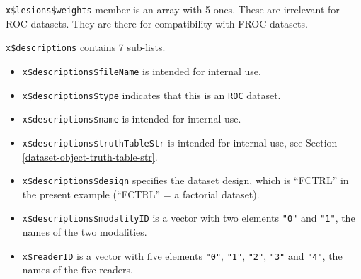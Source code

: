 \documentclass[
]{book}
\newenvironment{Shaded}{\begin{snugshade}}{\end{snugshade}}
\newcommand{\CommentTok}[1]{\textcolor[rgb]{0.56,0.35,0.01}{\textit{#1}}}
\newcommand{\FunctionTok}[1]{\textcolor[rgb]{0.00,0.00,0.00}{#1}}
\newcommand{\NormalTok}[1]{#1}
\newcommand{\SpecialCharTok}[1]{\textcolor[rgb]{0.00,0.00,0.00}{#1}}
\providecommand{\tightlist}{%
  \setlength{\itemsep}{0pt}\setlength{\parskip}{0pt}}
\begin{document}
\begin{Shaded}
\end{Shaded}

\texttt{x\$lesions\$weights} member is an array with 5 ones. These are irrelevant for ROC datasets. They are there for compatibility with FROC datasets.

\texttt{x\$descriptions} contains 7 sub-lists.

\begin{Shaded}
\end{Shaded}

\begin{itemize}
\tightlist
\item
  \texttt{x\$descriptions\$fileName} is intended for internal use.
\item
  \texttt{x\$descriptions\$type} indicates that this is an \texttt{ROC} dataset.
\item
  \texttt{x\$descriptions\$name} is intended for internal use.
\item
  \texttt{x\$descriptions\$truthTableStr} is intended for internal use, see Section \ref{dataset-object-truth-table-str}.
\item
  \texttt{x\$descriptions\$design} specifies the dataset design, which is ``FCTRL'' in the present example (``FCTRL'' = a factorial dataset).
\item
  \texttt{x\$descriptions\$modalityID} is a vector with two elements \texttt{"0"} and \texttt{"1"}, the names of the two modalities.
\item
  \texttt{x\$readerID} is a vector with five elements \texttt{"0"}, \texttt{"1"}, \texttt{"2"}, \texttt{"3"} and \texttt{"4"}, the names of the five readers.
\end{itemize}
\end{document}
